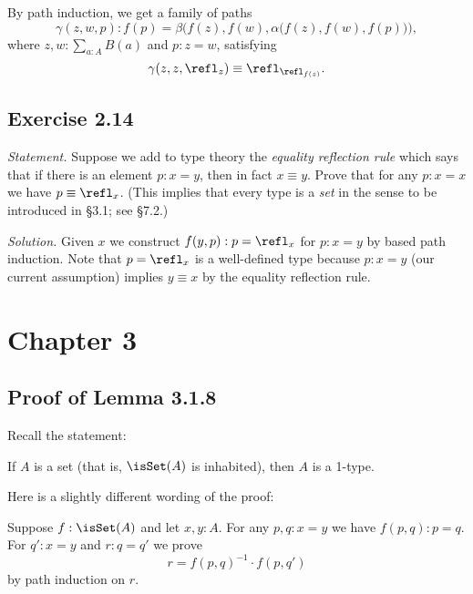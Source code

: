 \documentclass[12pt]{article}
\begin{document}
By path induction, we get a family of paths 
$$
\gamma(z,w,p):f(p)=\beta\Big(f(z),f(w),\alpha\big(f(z),f(w),f(p)\big)\Big),
$$ 
where $z,w:\sum_{a:A}B(a)$ and $p:z=w$, satisfying 
$$
\gamma(z,z,\refl_z)\equiv\refl_{\refl_{f(z)}}.
$$


\subsection{Exercise 2.14}

\emph{Statement.} Suppose we add to type theory the \emph{equality reflection rule} which says that if there is an element $p:x=y$, then in fact $x\equiv y$. Prove that for any $p:x=x$ we have $p\equiv\refl_x$. (This implies that every type is a \emph{set} in the sense to be introduced in \S3.1; see \S7.2.)

\nn\emph{Solution.} Given $x$ we construct $f(y,p):p=\refl_x$ for $p:x=y$ by based path induction. Note that $p=\refl_x$ is a well-defined type because $p:x=y$ (our current assumption) implies $y\equiv x$ by the equality reflection rule.


\section{Chapter 3}

\subsection{Proof of Lemma 3.1.8}\label{318}

Recall the statement: 

If $A$ is a set (that is, $\isSet(A)$ is inhabited), then $A$ is a 1-type. 

Here is a slightly different wording of the proof:

Suppose $f:\isSet(A)$ and let $x,y:A$. For any $p,q:x=y$ we have $f(p,q):p=q$. For $q':x=y$ and $r:q=q'$ we prove 
$$
r=f(p,q)^{-1}\cdot f(p,q')
$$ 
by path induction on $r$.



\end{document}
